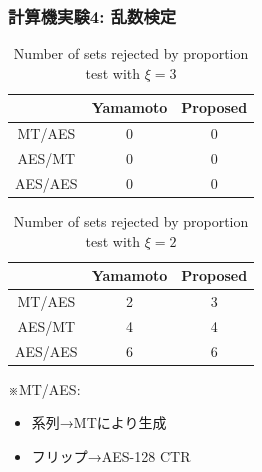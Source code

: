\documentclass[dvipdfmx,11pt]{beamer}
\begin{document}
\begin{frame}[c]\frametitle{計算機実験4: 乱数検定}
\begin{table}[htb]
  \centering
  \caption{Number of sets rejected by proportion test with $\xi=3$}
  \begin{tabular}{ccc} \hline
              & Yamamoto  & Proposed \\ \hline 
    MT/AES    & 0         & 0        \\
    AES/MT    & 0         & 0        \\
    AES/AES   & 0         & 0        \\ \hline 
  \end{tabular}
  \label{tab:proportion_1}
\end{table}
\begin{table}[htb]
  \centering
  \caption{Number of sets rejected by proportion test with $\xi=2$}
  \begin{tabular}{ccc} \hline
              & Yamamoto & Proposed \\ \hline 
    MT/AES    & 2         & 3        \\
    AES/MT    & 4         & 4        \\
    AES/AES   & 6         & 6        \\ \hline 
  \end{tabular}
  \label{tab:proportion_2}
\end{table}
%
※MT/AES:
\begin{itemize}
  \item 系列→MTにより生成
  \item フリップ→AES-128 CTR
\end{itemize}
%
\end{frame}
\end{document}
